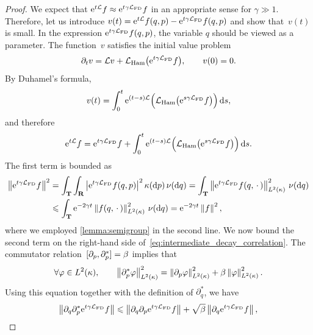 \documentclass[11pt,a4paper]{article}
\begin{document}
\begin{proof}
    We expect that $\mathrm{e}^{t \mathcal L} f \approx \mathrm{e}^{t \gamma \mathcal L_{\rm FD}} f$ in an appropriate sense for $\gamma \gg 1$.
    Therefore, let us introduce $v(t) = \mathrm{e}^{t \mathcal L} f(q, p) - \mathrm{e}^{t \gamma \mathcal L_{\rm FD}} f(q, p)$
    and show that~$v(t)$ is small.
    In the expression $\mathrm{e}^{t \gamma \mathcal L_{\rm FD}} f(q, p)$,
    the variable $q$ should be viewed as a parameter.
    The function~$v$ satisfies the initial value problem
    \[
        \partial_t v = \mathcal L v +  \mathcal L_{\rm Ham} \bigl(\mathrm{e}^{t \gamma \mathcal L_{\rm FD}} f\bigr), \qquad v(0) = 0.
    \]
    By Duhamel's formula,
    \[
        v(t) = \int_{0}^{t} \mathrm{e}^{(t-s) \mathcal L}  \Bigl( \mathcal L_{\rm Ham} \bigl(\mathrm{e}^{s \gamma \mathcal L_{\rm FD}} f\bigr) \Bigr) \, \mathrm d s,
    \]
    and therefore
    \begin{equation}
        \label{eq:intermediate_decay_correlation}
        \mathrm{e}^{t \mathcal L} f =  \mathrm{e}^{t \gamma \mathcal L_{\rm FD}} f
        + \int_{0}^{t} \mathrm{e}^{(t-s) \mathcal L}  \Bigl( \mathcal L_{\rm Ham} \bigl(\mathrm{e}^{s \gamma \mathcal L_{\rm FD}} f\bigr) \Bigr) \, \mathrm d s.
    \end{equation}
    The first term is bounded as
    \begin{align}
        \notag
        \norm{\e^{t \gamma \mathcal L_{\rm FD}} f}^2
        &= \int_{\torus} \int_{\real}  \abs{\e^{t \gamma \mathcal L_{\rm FD}} f(q, p) }^2 \kappa(\d p) \,\nu(\d q)
        = \int_{\torus} \norm{\e^{t \gamma \mathcal L_{\rm FD}} f(q, \dummy) }[L^2(\kappa)]^2 \, \nu(\d q) \\
        \label{eq:bound_first_term}
        &\leq \int_{\torus} \e^{-2 \gamma t} \norm{f(q, \dummy) }[L^2(\kappa)]^2 \, \nu(\d q)
        = \e^{-2\gamma t} \norm{f}^2,
    \end{align}
    where we employed \cref{lemma:semigroup} in the second line.
    We now bound the second term on the right-hand side of~\eqref{eq:intermediate_decay_correlation}.
    The commutator relation~$[\partial_p, \partial_p^*] = \beta$ implies that
    \[
        \forall \varphi \in L^2(\kappa), \qquad
        \norm{\partial_p^* \varphi}_{L^2(\kappa)}^2 = \norm{\partial_p \varphi}_{L^2(\kappa)}^2 + \beta \norm{\varphi}_{L^2(\kappa)}^2.
    \]
    Using this equation together with the definition of $\partial_q^*$,
    we have
    \begin{align*}
        \norm{\partial_q \partial_p^* \e^{t \gamma \mathcal L_{\rm FD}} f}
        &\leq \norm{\partial_q \partial_p \e^{t \gamma \mathcal L_{\rm FD}} f} + \sqrt{\beta} \norm{\partial_q \e^{t \gamma \mathcal L_{\rm FD}} f}, \\

\end{align*}
\end{proof}
\end{document}
